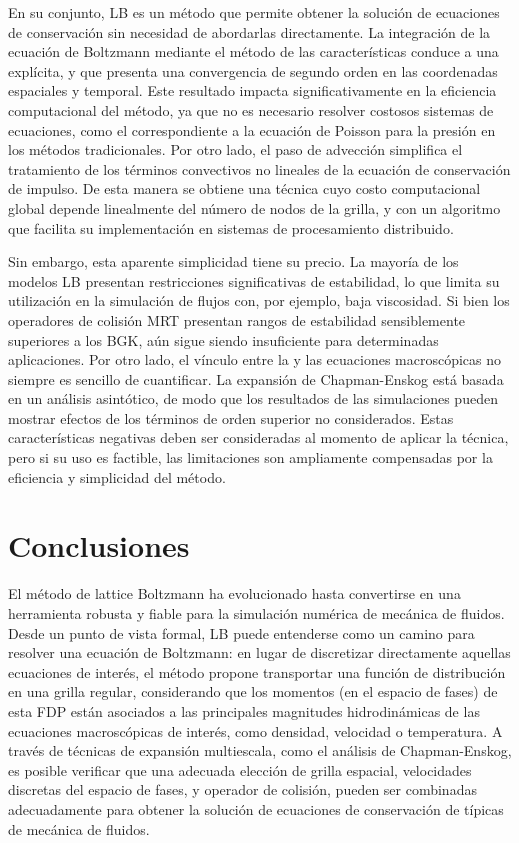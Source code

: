 En su conjunto, LB es un m\'etodo que permite obtener la soluci\'on de ecuaciones de conservaci\'on sin necesidad de abordarlas directamente. La integraci\'on de la ecuaci\'on de Boltzmann mediante el m\'etodo de las caracter\'isticas conduce a una \lbe{} expl\'icita, y que presenta una convergencia de segundo orden en las coordenadas espaciales y temporal. Este resultado impacta significativamente en la eficiencia computacional del m\'etodo, ya que no es necesario resolver costosos sistemas de ecuaciones, como el correspondiente a la ecuaci\'on de Poisson para la presi\'on en los m\'etodos tradicionales. Por otro lado, el paso de advecci\'on simplifica el tratamiento de los t\'erminos convectivos no lineales de la ecuaci\'on de conservaci\'on de impulso. De esta manera se obtiene una t\'ecnica cuyo costo computacional global depende linealmente del n\'umero de nodos de la grilla, y con un algoritmo que facilita su implementaci\'on en sistemas de procesamiento distribuido. 

Sin embargo, esta aparente simplicidad tiene su precio. La mayor\'ia de los modelos LB presentan restricciones significativas de estabilidad, lo que limita su utilizaci\'on en la simulaci\'on de flujos con, por ejemplo, baja viscosidad. Si bien los operadores de colisi\'on MRT presentan rangos de estabilidad sensiblemente superiores a los BGK, a\'un sigue siendo insuficiente para determinadas aplicaciones. Por otro lado, el v\'inculo entre la \lbe{} y las ecuaciones macrosc\'opicas no siempre es sencillo de cuantificar. La expansi\'on de Chapman-Enskog est\'a basada en un an\'alisis asint\'otico, de modo que los resultados de las simulaciones pueden mostrar efectos de los t\'erminos de orden superior no considerados. Estas caracter\'isticas negativas deben ser consideradas al momento de aplicar la t\'ecnica, pero si su uso es factible, las limitaciones son ampliamente compensadas por la eficiencia y simplicidad del m\'etodo.


\section{Conclusiones}

El m\'etodo de lattice Boltzmann ha evolucionado hasta convertirse en una herramienta robusta y fiable para la simulaci\'on num\'erica de mec\'anica de fluidos. Desde un punto de vista formal, LB puede entenderse como un camino para resolver una ecuaci\'on de Boltzmann: en lugar de discretizar directamente aquellas ecuaciones de inter\'es, el m\'etodo propone transportar una funci\'on de distribuci\'on en una grilla regular, considerando que los momentos (en el espacio de fases) de esta FDP est\'an asociados a las principales magnitudes hidrodin\'amicas de las ecuaciones macrosc\'opicas de inter\'es, como densidad, velocidad o temperatura. A trav\'es de t\'ecnicas de expansi\'on multiescala, como el an\'alisis de Chapman-Enskog, es posible verificar que una adecuada elecci\'on de grilla espacial, velocidades discretas del espacio de fases, y operador de colisi\'on, pueden ser combinadas adecuadamente para obtener la soluci\'on de ecuaciones de conservaci\'on de t\'ipicas de mec\'anica de fluidos. 